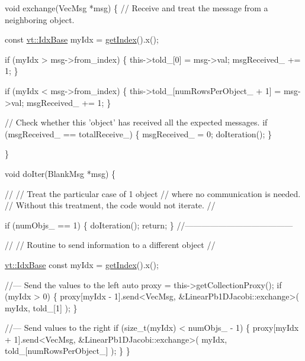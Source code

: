 \begin{DoxyCodeInclude}
  \textcolor{keywordtype}{void} exchange(VecMsg *msg) \{
    \textcolor{comment}{// Receive and treat the message from a neighboring object.}

    \textcolor{keyword}{const} \hyperlink{namespacevt_afb96657e28fa98eb685c5e0c6b1b122e}{vt::IdxBase} myIdx = \hyperlink{namespacecheckpoint_1_1dispatch_1_1typeregistry_aa75ef84e9b63a687784360ded2d56fe4}{getIndex}().x();

    \textcolor{keywordflow}{if} (myIdx > msg->from\_index) \{
      this->told\_[0] = msg->val;
      msgReceived\_ += 1;
    \}

    \textcolor{keywordflow}{if} (myIdx < msg->from\_index) \{
      this->told\_[numRowsPerObject\_ + 1] = msg->val;
      msgReceived\_ += 1;
    \}

    \textcolor{comment}{// Check whether this 'object' has received all the expected messages.}
    \textcolor{keywordflow}{if} (msgReceived\_ == totalReceive\_) \{
      msgReceived\_ = 0;
      doIteration();
    \}

  \}

  \textcolor{keywordtype}{void} doIter(BlankMsg *msg) \{

    \textcolor{comment}{//}
    \textcolor{comment}{// Treat the particular case of 1 object}
    \textcolor{comment}{// where no communication is needed.}
    \textcolor{comment}{// Without this treatment, the code would not iterate.}
    \textcolor{comment}{//}

    \textcolor{keywordflow}{if} (numObjs\_ == 1) \{
      doIteration();
      \textcolor{keywordflow}{return};
    \}
    \textcolor{comment}{//---------------------------------------}

    \textcolor{comment}{//}
    \textcolor{comment}{// Routine to send information to a different object}
    \textcolor{comment}{//}

    \hyperlink{namespacevt_afb96657e28fa98eb685c5e0c6b1b122e}{vt::IdxBase} \textcolor{keyword}{const} myIdx = \hyperlink{namespacecheckpoint_1_1dispatch_1_1typeregistry_aa75ef84e9b63a687784360ded2d56fe4}{getIndex}().x();

    \textcolor{comment}{//--- Send the values to the left}
    \textcolor{keyword}{auto} proxy = this->getCollectionProxy();
    \textcolor{keywordflow}{if} (myIdx > 0) \{
      proxy[myIdx - 1].send<VecMsg, &LinearPb1DJacobi::exchange>(
        myIdx, told\_[1]
      );
    \}

    \textcolor{comment}{//--- Send values to the right}
    \textcolor{keywordflow}{if} (\textcolor{keywordtype}{size\_t}(myIdx) < numObjs\_ - 1) \{
      proxy[myIdx + 1].send<VecMsg, &LinearPb1DJacobi::exchange>(
        myIdx, told\_[numRowsPerObject\_]
      );
    \}
  \}



\end{DoxyCodeInclude}
